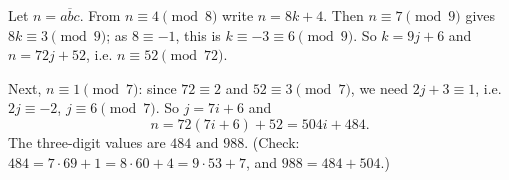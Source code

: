 Let $n=\overline{abc}$. From $n\equiv4\pmod8$ write $n=8k+4$. Then $n\equiv7\pmod9$ gives $8k\equiv3\pmod9$; as $8\equiv-1$, this is $k\equiv-3\equiv6\pmod9$. So $k=9j+6$ and $n=72j+52$, i.e. $n\equiv52\pmod{72}$.

Next, $n\equiv1\pmod7$: since $72\equiv2$ and $52\equiv3\pmod7$, we need $2j+3\equiv1$, i.e. $2j\equiv-2$, $j\equiv6\pmod7$. So $j=7i+6$ and
\[
n=72(7i+6)+52=504i+484 .
\]
The three-digit values are $\boxed{484\text{ and }988}$. (Check: $484=7\cdot69+1=8\cdot60+4=9\cdot53+7$, and $988=484+504$.)
